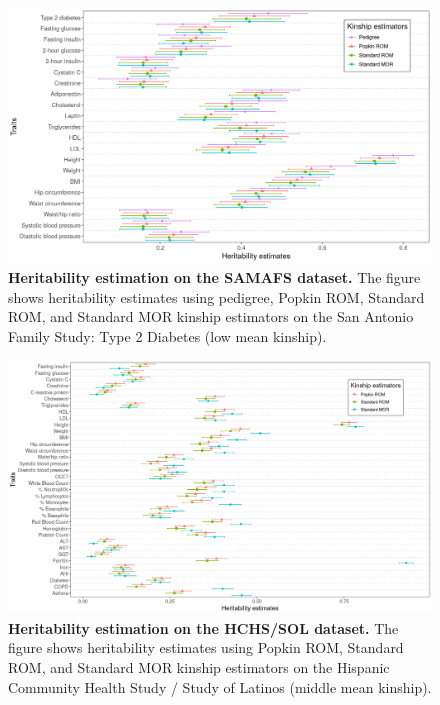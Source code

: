 \documentclass[11pt]{article}
\begin{document}

\begin{figure}[bp!]
  \centering
  \includegraphics[width=\textwidth]{data/Fig2_T2D_maf001_agesex.png}
  \caption{
    {\bf Heritability estimation on the SAMAFS dataset.}
    The figure shows heritability estimates using pedigree, Popkin ROM, Standard ROM, and Standard MOR kinship estimators on the San Antonio Family Study: Type 2 Diabetes (low mean kinship).
    }
  \label{fig:T2D}
\end{figure}

\begin{figure}[bp!]
  \centering
  \includegraphics[width=\textwidth]{data/Fig2_HCHS_All_maf001_agesex.png}
  \caption{
    {\bf Heritability estimation on the HCHS/SOL dataset.}
    The figure shows heritability estimates using Popkin ROM, Standard ROM, and Standard MOR kinship estimators on the Hispanic Community Health Study / Study of Latinos (middle mean kinship).
    }
  \label{fig:HCHS}
\end{figure}
\end{document}
